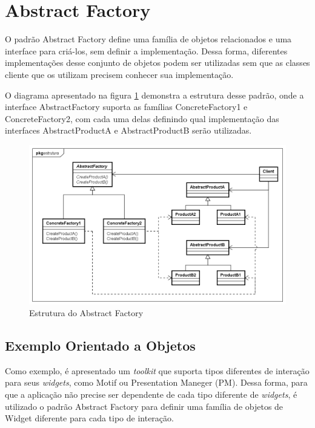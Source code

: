 \section{Abstract Factory}

O padrão Abstract Factory define uma família 
de objetos relacionados e uma interface para 
criá-los, sem definir a implementação. Dessa 
forma, diferentes implementações desse 
conjunto de objetos podem ser utilizadas 
sem que as classes cliente que os utilizam 
precisem conhecer sua implementação.

O diagrama apresentado na figura \ref{abfactory_struct} 
demonstra a estrutura desse padrão, onde a 
interface AbstractFactory suporta as famílias 
ConcreteFactory1 e ConcreteFactory2, com cada uma 
delas definindo qual implementação das interfaces 
AbstractProductA e AbstractProductB serão 
utilizadas.

\begin{figure}[htb]
	\caption{\label{abfactory_struct}Estrutura do Abstract Factory}
	\begin{center}
	    \includegraphics[scale=0.5]{5_padroes-contexto-funcional/5.1_criacionais/5.1.2_abstract-factory/abstractfactory_estrutura.png}
	\end{center}
\end{figure}

\subsection*{Exemplo Orientado a Objetos}

Como exemplo, é apresentado um \textit{toolkit} 
que suporta tipos diferentes de interação para 
seus \textit{widgets}, como Motif ou Presentation 
Maneger (PM). Dessa forma, para que a aplicação 
não precise ser dependente de cada tipo 
diferente de \textit{widgets}, é 
utilizado o padrão Abstract Factory para 
definir uma família de objetos de Widget 
diferente para cada tipo de interação. 

